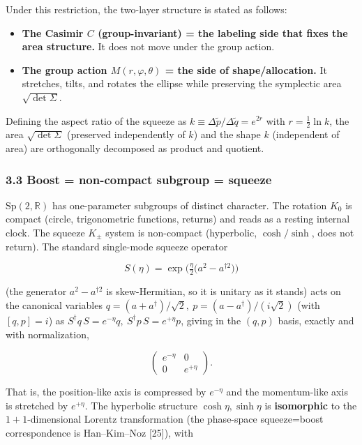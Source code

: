 \documentclass[
]{article}
\providecommand{\tightlist}{%
  \setlength{\itemsep}{0pt}\setlength{\parskip}{0pt}}
\begin{document}
Under this restriction, the two-layer structure is stated as follows:

\begin{itemize}
\tightlist
\item
  \textbf{The Casimir \(C\) (group-invariant) = the labeling side that
  fixes the area structure.} It does not move under the group action.
\item
  \textbf{The group action \(M(r,\varphi,\theta)\) = the side of
  shape/allocation.} It stretches, tilts, and rotates the ellipse while
  preserving the symplectic area \(\sqrt{\det\Sigma}\).
\end{itemize}

Defining the aspect ratio of the squeeze as
\(k\equiv\Delta\tilde p/\Delta\tilde q=e^{2r}\) with
\(r=\tfrac12\ln k\), the area \(\sqrt{\det\Sigma}\) (preserved
independently of \(k\)) and the shape \(k\) (independent of area) are
orthogonally decomposed as product and quotient.

\subsubsection{3.3 Boost = non-compact subgroup =
squeeze}\label{boost-non-compact-subgroup-squeeze}

\(\mathrm{Sp}(2,\mathbb{R})\) has one-parameter subgroups of distinct
character. The rotation \(K_0\) is compact (circle, trigonometric
functions, returns) and reads as a resting internal clock. The squeeze
\(K_\pm\) system is non-compact (hyperbolic, \(\cosh/\sinh\), does not
return). The standard single-mode squeeze operator

\[S(\eta)=\exp\!\Big(\tfrac{\eta}{2}\big(a^2-a^{\dagger 2}\big)\Big)\]

(the generator \(a^2-a^{\dagger 2}\) is skew-Hermitian, so it is unitary
as it stands) acts on the canonical variables
\(q=(a+a^\dagger)/\sqrt2,\ p=(a-a^\dagger)/(i\sqrt2)\) (with
\([q,p]=i\)) as
\(S^\dagger q\,S=e^{-\eta}q,\ S^\dagger p\,S=e^{+\eta}p\), giving in the
\((q,p)\) basis, exactly and with normalization,

\[\begin{pmatrix}e^{-\eta}&0\\0&e^{+\eta}\end{pmatrix}.\]

That is, the position-like axis is compressed by \(e^{-\eta}\) and the
momentum-like axis is stretched by \(e^{+\eta}\). The hyperbolic
structure \(\cosh\eta,\sinh\eta\) is \textbf{isomorphic} to the
\(1{+}1\)-dimensional Lorentz transformation (the phase-space
squeeze=boost correspondence is Han--Kim--Noz {[}25{]}), with
\end{document}
